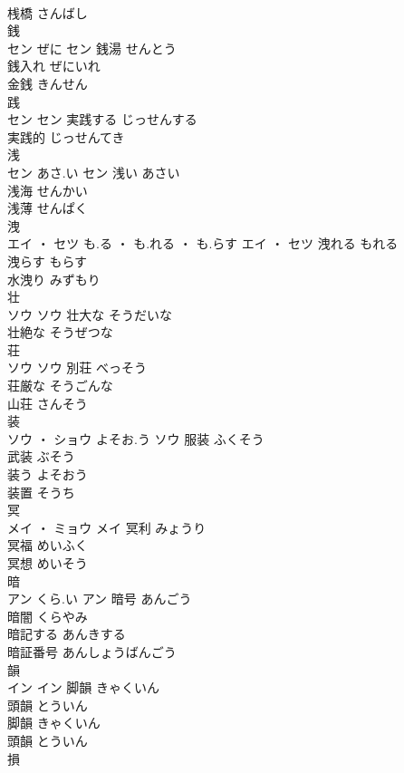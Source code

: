 \documentclass[8pt]{extreport}
\begin{document}
\begin{CJK}{UTF8}{min}
\\	桟橋	さんばし	
\\	銭	
\\	セン	ぜに	セン	銭湯	せんとう	
\\	銭入れ	ぜにいれ	
\\	金銭	きんせん	
\\	践	
\\	セン		セン	実践する	じっせんする	
\\	実践的	じっせんてき	
\\	浅	
\\	セン	あさ.い	セン	浅い	あさい	
\\	浅海	せんかい	
\\	浅薄	せんぱく	
\\	洩	
\\	エイ ・ セツ	も.る ・ も.れる ・ も.らす	エイ ・ セツ	洩れる	もれる	
\\	洩らす	もらす	
\\	水洩り	みずもり	
\\	壮	
\\	ソウ		ソウ	壮大な	そうだいな	
\\	壮絶な	そうぜつな	
\\	荘	
\\	ソウ		ソウ	別荘	べっそう	
\\	荘厳な	そうごんな	
\\	山荘	さんそう	
\\	装	
\\	ソウ ・ ショウ	よそお.う	ソウ	服装	ふくそう	
\\	武装	ぶそう	
\\	装う	よそおう	
\\	装置	そうち	
\\	冥	
\\	メイ ・ ミョウ		メイ	冥利	みょうり	
\\	冥福	めいふく	
\\	冥想	めいそう	
\\	暗	
\\	アン	くら.い	アン	暗号	あんごう	
\\	暗闇	くらやみ	
\\	暗記する	あんきする	
\\	暗証番号	あんしょうばんごう	
\\	韻	
\\	イン		イン	脚韻	きゃくいん	
\\	頭韻	とういん	
\\	脚韻	きゃくいん	
\\	頭韻	とういん	
\\	損	

\end{CJK}
\end{document}
